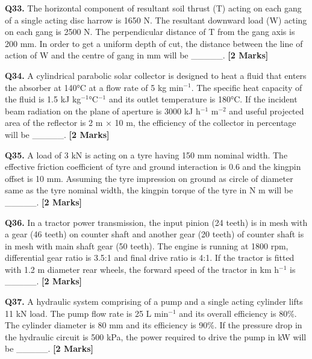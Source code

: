 \documentclass[11pt]{article}
\newcommand{\questionb}[2]{
    \noindent\textbf{Q#2.} #1 \hfill \textbf{[2 Marks]}
}
\begin{document}
\vspace{0.5cm}

\questionb{The horizontal component of resultant soil thrust (T) acting on each gang of a single acting disc harrow is 1650 N. The resultant downward load (W) acting on each gang is 2500 N. The perpendicular distance of T from the gang axis is 200 mm. In order to get a uniform depth of cut, the distance between the line of action of W and the centre of gang in mm will be \_\_\_\_\_.}{33}

\vspace{0.5cm}

\questionb{A cylindrical parabolic solar collector is designed to heat a fluid that enters the absorber at 140°C at a flow rate of 5 kg min$^{-1}$. The specific heat capacity of the fluid is 1.5 kJ kg$^{-1}$°C$^{-1}$ and its outlet temperature is 180°C. If the incident beam radiation on the plane of aperture is 3000 kJ h$^{-1}$ m$^{-2}$ and useful projected area of the reflector is 2 m × 10 m, the efficiency of the collector in percentage will be \_\_\_\_\_.}{34}

\vspace{0.5cm}

\questionb{A load of 3 kN is acting on a tyre having 150 mm nominal width. The effective friction coefficient of tyre and ground interaction is 0.6 and the kingpin offset is 10 mm. Assuming the tyre impression on ground as circle of diameter same as the tyre nominal width, the kingpin torque of the tyre in N m will be \_\_\_\_\_.}{35}

\vspace{0.5cm}

\questionb{In a tractor power transmission, the input pinion (24 teeth) is in mesh with a gear (46 teeth) on counter shaft and another gear (20 teeth) of counter shaft is in mesh with main shaft gear (50 teeth). The engine is running at 1800 rpm, differential gear ratio is 3.5:1 and final drive ratio is 4:1. If the tractor is fitted with 1.2 m diameter rear wheels, the forward speed of the tractor in km h$^{-1}$ is \_\_\_\_\_.}{36}

\vspace{0.5cm}

\questionb{A hydraulic system comprising of a pump and a single acting cylinder lifts 11 kN load. The pump flow rate is 25 L min$^{-1}$ and its overall efficiency is 80\%. The cylinder diameter is 80 mm and its efficiency is 90\%. If the pressure drop in the hydraulic circuit is 500 kPa, the power required to drive the pump in kW will be \_\_\_\_\_.}{37}
\end{document}

